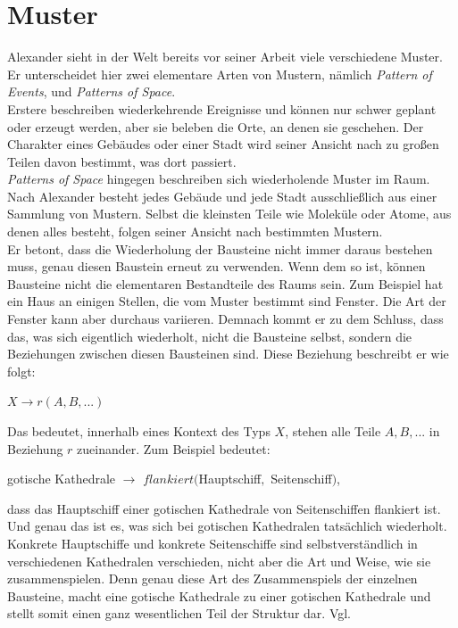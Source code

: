 \documentclass[fontsize=11pt,a4paper,final]{scrreprt}[2003/01/01]
\begin{document}
\section{Muster}
Alexander sieht in der Welt bereits vor seiner Arbeit viele verschiedene Muster. Er unterscheidet hier zwei elementare Arten von Mustern, nämlich \textit{Pattern of Events}, und \textit{Patterns of Space}. \\
Erstere beschreiben wiederkehrende Ereignisse und können nur schwer geplant oder erzeugt werden, aber sie beleben die Orte, an denen sie geschehen. Der Charakter eines Gebäudes oder einer Stadt wird seiner Ansicht nach zu großen Teilen davon bestimmt, was dort passiert.  \\
\textit{Patterns of Space} hingegen beschreiben sich wiederholende Muster im Raum. Nach Alexander besteht jedes Gebäude und jede Stadt ausschließlich aus einer Sammlung von Mustern. Selbst die kleinsten Teile wie Moleküle oder Atome, aus denen alles besteht, folgen seiner Ansicht nach bestimmten Mustern. \\ 
Er betont, dass die Wiederholung der Bausteine nicht immer daraus bestehen muss, genau diesen Baustein erneut zu verwenden. Wenn dem so ist, können Bausteine nicht die elementaren Bestandteile des Raums sein. Zum Beispiel hat ein Haus an einigen Stellen, die vom Muster bestimmt sind Fenster. Die Art der Fenster kann aber durchaus variieren. Demnach kommt er zu dem Schluss, dass das, was sich eigentlich wiederholt, nicht die Bausteine selbst, sondern die Beziehungen zwischen diesen Bausteinen sind. Diese Beziehung beschreibt er wie folgt:
\begin{center}
	$ X \rightarrow r(A, B, ...) $
\end{center}
Das bedeutet, innerhalb eines Kontext des Typs $X$, stehen alle Teile $A, B, ...$ in Beziehung $r$ zueinander. Zum Beispiel bedeutet:
\begin{center}
	gotische Kathedrale $\rightarrow$ $flankiert($Hauptschiff$,$ Seitenschiff$)$,
\end{center}
dass das Hauptschiff einer gotischen Kathedrale von Seitenschiffen flankiert ist. Und genau das ist es, was sich bei gotischen Kathedralen tatsächlich wiederholt. Konkrete Hauptschiffe und konkrete Seitenschiffe sind selbstverständlich in verschiedenen Kathedralen verschieden, nicht aber die Art und Weise, wie sie zusammenspielen. Denn genau diese Art des Zusammenspiels der einzelnen Bausteine, macht eine gotische Kathedrale zu einer gotischen Kathedrale und stellt somit einen ganz wesentlichen Teil der Struktur dar. Vgl. \cite[S. 55 - 122]{Alexander1979}
\end{document}
